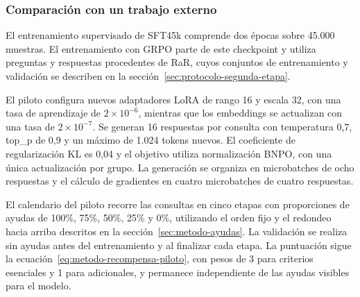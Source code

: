 \subsubsection{Comparación con un trabajo externo}
El entrenamiento supervisado de SFT45k comprende dos épocas sobre 45.000 muestras. El entrenamiento con GRPO parte de este checkpoint y utiliza preguntas y respuestas procedentes de RaR, cuyos conjuntos de entrenamiento y validación se describen en la sección~\ref{sec:protocolo-segunda-etapa}.

El piloto configura nuevos adaptadores LoRA de rango 16 y escala 32, con una tasa de aprendizaje de $2\times10^{-6}$, mientras que los embeddings se actualizan con una tasa de $2\times10^{-7}$. Se generan 16 respuestas por consulta con temperatura 0,7, top\_p de 0,9 y un máximo de 1.024 tokens nuevos. El coeficiente de regularización KL es 0,04 y el objetivo utiliza normalización BNPO, con una única actualización por grupo. La generación se organiza en microbatches de ocho respuestas y el cálculo de gradientes en cuatro microbatches de cuatro respuestas.

El calendario del piloto recorre las consultas en cinco etapas con proporciones de ayudas de 100\%, 75\%, 50\%, 25\% y 0\%, utilizando el orden fijo y el redondeo hacia arriba descritos en la sección~\ref{sec:metodo-ayudas}. La validación se realiza sin ayudas antes del entrenamiento y al finalizar cada etapa. La puntuación sigue la ecuación~\ref{eq:metodo-recompensa-piloto}, con pesos de 3 para criterios esenciales y 1 para adicionales, y permanece independiente de las ayudas visibles para el modelo.
